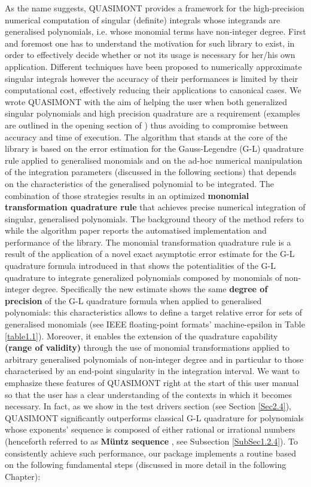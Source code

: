 \documentclass[a4paper, twosided]{book}
\begin{document}
\noindent
As the name suggests, QUASIMONT provides a framework for the high-precision numerical computation of singular (definite) integrals whose integrands are generalised polynomials, i.e. whose monomial terms have non-integer degree. First and foremost one has to understand the motivation for such library to exist, in order to effectively decide whether or not its usage is necessary for her/his own application. Different techniques have been proposed to numerically approximate singular integrals however the accuracy of their performances is limited by their computational cost, effectively reducing their applications to canonical cases. We wrote QUASIMONT with the aim of helping the user when both generalized singular polynomials and high precision quadrature are a requirement (examples are outlined in the opening section of \cite{Lombardi21}) thus avoiding to compromise between accuracy and time of execution. The algorithm that stands at the core of the library is based on the error estimation for the Gauss-Legendre (G-L) quadrature rule applied to generalised monomials and on the ad-hoc numerical manipulation of the integration parameters (discussed in the following sections) that depends on the characteristics of the generalised polynomial to be integrated. The combination of those strategies results in an optimized \color{poliDarkBlue} \textbf{monomial transformation quadrature rule} \color{black} that achieves precise numerical integration of singular, generalised polynomials. The background theory of the method refers to \cite{Lombardi09} while the algorithm paper \cite{Lombardi21} reports the automatised implementation and performance of the library. The monomial transformation quadrature rule is a result of the application of a novel exact asymptotic error estimate for the G-L quadrature formula introduced in \cite{Lombardi09} that shows the potentialities of the G-L quadrature to integrate generalized polynomials composed by monomials of non-integer degree. Specifically the new estimate shows the same \color{poliDarkBlue} \textbf{degree of precision} \color{black} of the G-L quadrature formula when applied to generalised polynomials: this characteristics allows to define a  target relative error for sets of generalised monomials (see IEEE floating-point formats' machine-epsilon in Table \ref{table1.1}). Moreover, it enables the extension of the quadrature capability  \color{poliDarkBlue} \textbf{(range of validity)} \color{black} through the use of monomial transformations applied to arbitrary generalised polynomials of non-integer degree and in particular to those characterised by an end-point singularity in the integration interval. We want to emphasize these features of QUASIMONT right at the start of this user manual so that the user has a clear understanding of the contexts in which it becomes necessary. In fact, as we show in the test drivers section (see Section \ref{Sec2.4}), QUASIMONT significantly outperforms classical G-L quadrature for polynomials whose exponents' sequence is composed of either rational or irrational numbers (henceforth referred to as \color{poliDarkBlue} \textbf{Müntz sequence} \color{black}, see Subsection \ref{SubSec1.2.4}). To consistently achieve such performance, our package implements a routine based on the following fundamental steps (discussed in more detail in the following Chapter):
\end{document}
